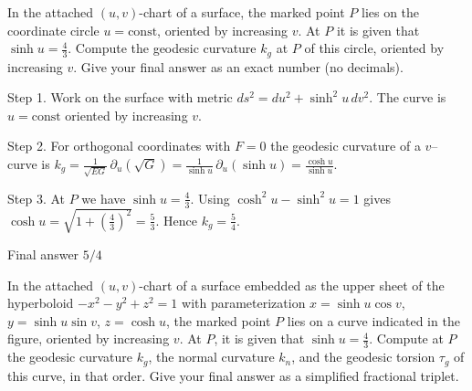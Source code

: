 In the attached $(u,v)$-chart of a surface, the marked point $P$ lies on the coordinate circle $u=\text{const}$, oriented by increasing $v$. At $P$ it is given that $\sinh u=\tfrac{4}{3}$. Compute the geodesic curvature $k_{g}$ at $P$ of this circle, oriented by increasing $v$. Give your final answer as an exact number (no decimals).


Step 1. Work on the surface with metric $ds^{2}=du^{2}+\sinh^{2}u\,dv^{2}$. The curve is $u=\text{const}$ oriented by increasing $v$.

Step 2. For orthogonal coordinates with $F=0$ the geodesic curvature of a $v$–curve is $k_g=\tfrac{1}{\sqrt{EG}}\,\partial_u(\sqrt{G})=\tfrac{1}{\sinh u}\,\partial_u(\sinh u)=\tfrac{\cosh u}{\sinh u}$.

Step 3. At $P$ we have $\sinh u=\tfrac{4}{3}$. Using $\cosh^{2}u-\sinh^{2}u=1$ gives $\cosh u=\sqrt{1+\left(\tfrac{4}{3}\right)^{2}}=\tfrac{5}{3}$. Hence $k_g=\tfrac{5}{4}$.

Final answer $5/4$


In the attached $(u, v)$-chart of a surface embedded as the upper sheet of the hyperboloid $-x^2 - y^2 + z^2 = 1$ with parameterization $x = \sinh u \cos v$, $y = \sinh u \sin v$, $z = \cosh u$, the marked point $P$ lies on a curve indicated in the figure, oriented by increasing $v$. At $P$, it is given that $\sinh u = \frac{4}{3}$. Compute at $P$ the geodesic curvature $k_g$, the normal curvature $k_n$, and the geodesic torsion $\tau_g$ of this curve, in that order. Give your final answer as a simplified fractional triplet.
